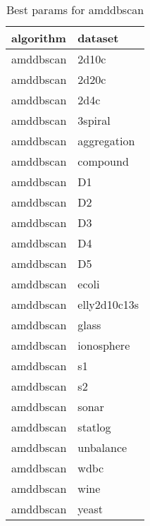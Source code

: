 \begin{table}[H]
\centering
\caption{Best params for amddbscan}
\label{S5_Table}
\begin{tabular}{|l|l|}
\hline
algorithm & dataset \\
\hline
amddbscan & 2d10c \\
\hline
amddbscan & 2d20c \\
\hline
amddbscan & 2d4c \\
\hline
amddbscan & 3spiral \\
\hline
amddbscan & aggregation \\
\hline
amddbscan & compound \\
\hline
amddbscan & D1 \\
\hline
amddbscan & D2 \\
\hline
amddbscan & D3 \\
\hline
amddbscan & D4 \\
\hline
amddbscan & D5 \\
\hline
amddbscan & ecoli \\
\hline
amddbscan & elly2d10c13s \\
\hline
amddbscan & glass \\
\hline
amddbscan & ionosphere \\
\hline
amddbscan & s1 \\
\hline
amddbscan & s2 \\
\hline
amddbscan & sonar \\
\hline
amddbscan & statlog \\
\hline
amddbscan & unbalance \\
\hline
amddbscan & wdbc \\
\hline
amddbscan & wine \\
\hline
amddbscan & yeast \\
\hline
\end{tabular}
\end{table}

\clearpage


